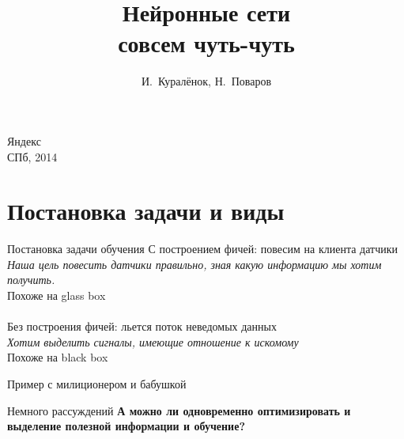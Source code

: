 \documentclass[14pt, fleqn, xcolor={dvipsnames, table}]{beamer}
\title{Нейронные сети\\\small{совсем чуть-чуть}}
\author[]{\small{%
И.~Куралёнок,
Н.~Поваров}}
\date{}
\begin{document}
\begin{frame}
\maketitle
\small
\begin{center}
\vspace{-60pt}
\normalsize {\color{red}Я}ндекс \\
\vspace{80pt}
\footnotesize СПб, 2014
\end{center}
\end{frame}
\section{Постановка задачи и виды} %

\begin{frame}{Постановка задачи обучения}{}
{\color{blue}С построением фичей}: повесим на клиента датчики \\
\textit{Наша цель повесить датчики правильно, зная какую информацию мы хотим получить.}\\
Похоже на glass box\\
~\\
{\color{blue}Без построения фичей}: льется поток неведомых данных \\
\textit{Хотим выделить сигналы, имеющие отношение к искомому} \\
Похоже на black box
\end{frame}

\begin{frame}{Пример с милиционером и бабушкой}

\end{frame}

\begin{frame}{Немного рассуждений}
\small
\textbf{А можно ли одновременно оптимизировать и выделение полезной информации и обучение?}\\
\begin{itemize}
\end{itemize}
\end{frame}
\end{document}
